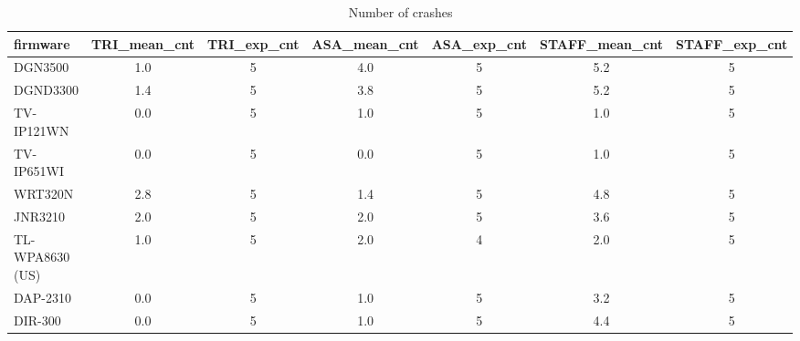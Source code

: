 \begin{table}[ht]
\centering
\renewcommand{\arraystretch}{1.06}
\setlength{\tabcolsep}{4pt}
\begin{tabular}{|l||c|c|c|c|c|c|}
\hline
{\sc firmware} & {\sc TRI\_mean\_cnt} & {\sc TRI\_exp\_cnt} & {\sc ASA\_mean\_cnt} & {\sc ASA\_exp\_cnt} & {\sc STAFF\_mean\_cnt} & {\sc STAFF\_exp\_cnt} \\
\toprule
\hline
DGN3500 & 1.0 & 5 & 4.0 & 5 & 5.2 & 5 \\
\hline
DGND3300 & 1.4 & 5 & 3.8 & 5 & 5.2 & 5 \\
\hline
TV-IP121WN & 0.0 & 5 & 1.0 & 5 & 1.0 & 5 \\
\hline
TV-IP651WI & 0.0 & 5 & 0.0 & 5 & 1.0 & 5 \\
\hline
WRT320N & 2.8 & 5 & 1.4 & 5 & 4.8 & 5 \\
\hline
JNR3210 & 2.0 & 5 & 2.0 & 5 & 3.6 & 5 \\
\hline
TL-WPA8630 (US) & 1.0 & 5 & 2.0 & 4 & 2.0 & 5 \\
\hline
DAP-2310 & 0.0 & 5 & 1.0 & 5 & 3.2 & 5 \\
\hline
DIR-300 & 0.0 & 5 & 1.0 & 5 & 4.4 & 5 \\
\hline
\end{tabular}
\caption{Number of crashes}
\end{table}
